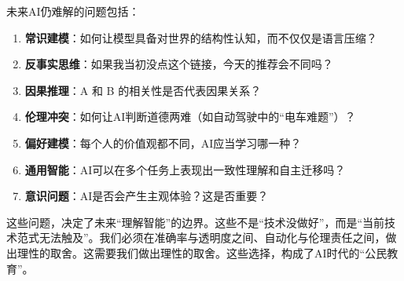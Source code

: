 未来AI仍难解的问题包括：

\begin{enumerate}
\item \textbf{常识建模}：如何让模型具备对世界的结构性认知，而不仅仅是语言压缩？
\item \textbf{反事实思维}：如果我当初没点这个链接，今天的推荐会不同吗？
\item \textbf{因果推理}：A 和 B 的相关性是否代表因果关系？
\item \textbf{伦理冲突}：如何让AI判断道德两难（如自动驾驶中的“电车难题”）？
\item \textbf{偏好建模}：每个人的价值观都不同，AI应当学习哪一种？
\item \textbf{通用智能}：AI可以在多个任务上表现出一致性理解和自主迁移吗？
\item \textbf{意识问题}：AI是否会产生主观体验？这是否重要？
\end{enumerate}

这些问题，决定了未来“理解智能”的边界。这些不是“技术没做好”，而是“当前技术范式无法触及”。我们必须在准确率与透明度之间、自动化与伦理责任之间，做出理性的取舍。这需要我们做出理性的取舍。这些选择，构成了AI时代的“公民教育”。


\nocite{*}
\printbibliography[heading=bibintoc, title=\ebibname]
\appendix

\newpage


